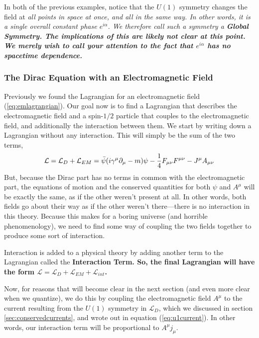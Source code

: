 \documentclass[12pt,epsf]{article}
\begin{document}
In both of the previous examples, notice that the $U(1)$ symmetry
changes the field at \it all \rm points in space at once, and all in
the same way.  In other words, it is a single overall constant phase
$e^{i\alpha}$.	We therefore call such a symmetry a \bf Global 
Symmetry\rm.  The implications of this are likely not clear at this point.
 We merely wish to call your attention to the fact that $e^{i\alpha}$
has no spacetime dependence.  

\subsubsection{The Dirac Equation with an Electromagnetic Field}

Previously we found the Lagrangian for an electromagnetic field
(\ref{eq:emlagrangian}).  Our goal now is to find a Lagrangian that
describes the electromagnetic field and a spin-$1/2$ particle that
couples to the electromagnetic field, and additionally the interaction
between them.  We start by writing down a Lagrangian without any
interaction.  This will simply be the sum of the two terms,
\begin{eqnarray}
\mathcal{L} = \mathcal{L}_D+\mathcal{L}_{EM} = \bar \psi (i
\gamma^{\mu}\partial_{\mu} - m)\psi - {1\over 4} F_{\mu \nu}F^{\mu \nu}
- J^{\mu}A_{\mu \nu} \label{eq:emintlag1}
\end{eqnarray}
But, because the Dirac part has no terms in common with the
electromagnetic part, the equations of motion and the conserved
quantities for both $\psi$ and $A^{\mu}$ will be exactly the same, as if
the other weren't present at all.  In other words, both fields go about
their way as if the other weren't there---there is no interaction in
this theory.  Because this makes for a boring universe (and horrible
phenomenology), we need to find some way of coupling the two fields
together to produce some sort of interaction.  

Interaction is added to a physical theory by adding another term to the
Lagrangian called the \bf Interaction Term\rm.	So, the final
Lagrangian will have the form $\mathcal{L} =
\mathcal{L}_D+\mathcal{L}_{EM}+\mathcal{L}_{int}$.  

Now, for reasons that will become clear in the next section (and even
more clear when we quantize), we do this by coupling the
electromagnetic field $A^{\mu}$ to the current resulting from the
$U(1)$ symmetry in $\mathcal{L}_D$, which we discussed in section
\ref{sec:conservedcurrents}, and wrote out in equation
(\ref{eq:u1current}).  In other words, our interaction term will be
proportional to $A^{\mu}j_{\mu}$.  
\end{document}
